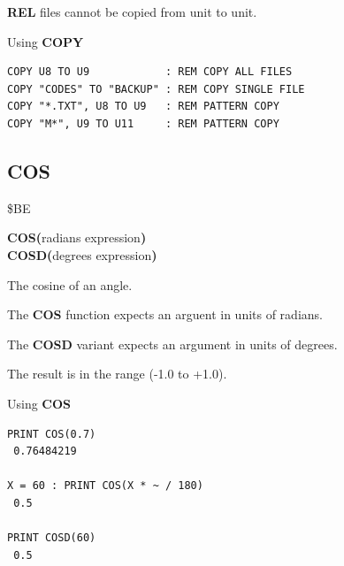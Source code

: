 \begin{description}[leftmargin=2cm,style=nextline]
                  {\bf REL} files cannot be copied from unit to unit.

\item [Examples:] Using {\bf COPY}

\begin{tcolorbox}[colback=black,coltext=white]
\verbatimfont{\codefont}
\begin{verbatim}
COPY U8 TO U9            : REM COPY ALL FILES
COPY "CODES" TO "BACKUP" : REM COPY SINGLE FILE
COPY "*.TXT", U8 TO U9   : REM PATTERN COPY
COPY "M*", U9 TO U11     : REM PATTERN COPY
\end{verbatim}
\end{tcolorbox}
\end{description}


\newpage
\subsection{COS}
\begin{description}[leftmargin=2cm,style=nextline]
\item [Token:]    \$BE

\item [Format:]   {\bf COS(}radians expression{\bf )} \\
                  {\bf COSD(}degrees expression{\bf )}

\item [Returns:]  The cosine of an angle.

                  The {\bf COS} function expects an arguent in units of radians.

                  The {\bf COSD} variant expects an argument in units of degrees.

                  The result is in the range (-1.0 to +1.0).

\item [Examples:] Using {\bf COS}

\begin{tcolorbox}[colback=black,coltext=white]
\verbatimfont{\codefont}
\begin{verbatim}
PRINT COS(0.7)
 0.76484219

X = 60 : PRINT COS(X * ~ / 180)
 0.5

PRINT COSD(60)
 0.5
\end{verbatim}
\end{tcolorbox}
\end{description}

